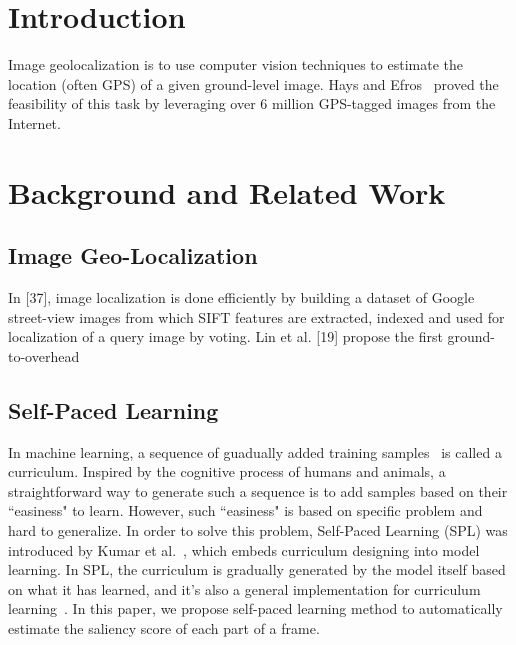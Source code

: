 
\section{Introduction}
\par
Image geolocalization is to use computer vision techniques to estimate the location (often GPS) of a given ground-level image. Hays and Efros~\cite{} proved the feasibility of this task by leveraging over 6 million GPS-tagged images from the Internet. 
\section{Background and Related Work}
\subsection{Image Geo-Localization}
\par
In [37], image localization is done efficiently by building a dataset of Google street-view images from which SIFT features are extracted, indexed and used for localization of a query image by voting. Lin et al. [19] propose the first ground-to-overhead

\subsection{Self-Paced Learning}
\par
In machine learning, a sequence of guadually added training samples~\cite{bengio2009curriculum} is called a curriculum. Inspired by the cognitive process of humans and animals, a straightforward way to generate such a sequence is to add samples based on their ``easiness" to learn. However, such ``easiness" is based on specific problem and hard to generalize. In order to solve this problem, Self-Paced Learning (SPL) was introduced by Kumar et al.~\cite{kumar2010self}, which embeds curriculum designing into model learning. In SPL, the curriculum is gradually generated by the model itself based on what it has learned, and it's also a general implementation for curriculum learning~\cite{jiang2014easy, tang2012shifting, jiang2014self, jiang2015self}. In this paper, we propose self-paced learning method to automatically estimate the saliency score of each part of a frame.
